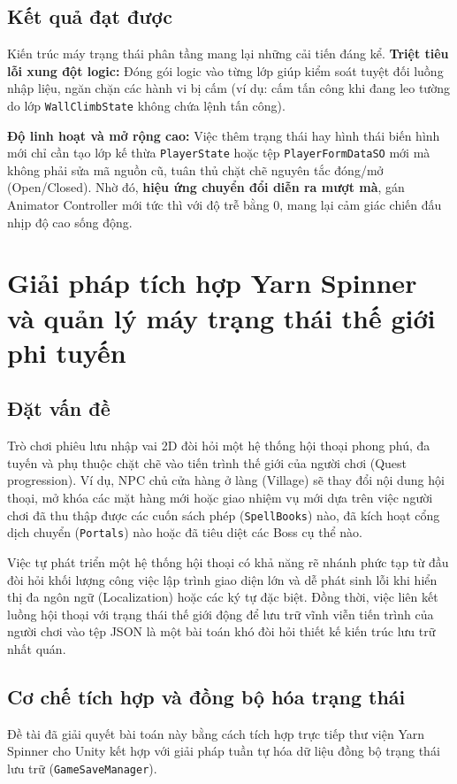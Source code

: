 \subsection{Kết quả đạt được}
Kiến trúc máy trạng thái phân tầng mang lại những cải tiến đáng kể. \textbf{Triệt tiêu lỗi xung đột logic:} Đóng gói logic vào từng lớp giúp kiểm soát tuyệt đối luồng nhập liệu, ngăn chặn các hành vi bị cấm (ví dụ: cấm tấn công khi đang leo tường do lớp \texttt{WallClimbState} không chứa lệnh tấn công).

\textbf{Độ linh hoạt và mở rộng cao:} Việc thêm trạng thái hay hình thái biến hình mới chỉ cần tạo lớp kế thừa \texttt{PlayerState} hoặc tệp \texttt{PlayerFormDataSO} mới mà không phải sửa mã nguồn cũ, tuân thủ chặt chẽ nguyên tắc đóng/mở (Open/Closed). Nhờ đó, \textbf{hiệu ứng chuyển đổi diễn ra mượt mà}, gán Animator Controller mới tức thì với độ trễ bằng 0, mang lại cảm giác chiến đấu nhịp độ cao sống động.

\section{Giải pháp tích hợp Yarn Spinner và quản lý máy trạng thái thế giới phi tuyến}

\subsection{Đặt vấn đề}
Trò chơi phiêu lưu nhập vai 2D đòi hỏi một hệ thống hội thoại phong phú, đa tuyến và phụ thuộc chặt chẽ vào tiến trình thế giới của người chơi (Quest progression). Ví dụ, NPC chủ cửa hàng ở làng (Village) sẽ thay đổi nội dung hội thoại, mở khóa các mặt hàng mới hoặc giao nhiệm vụ mới dựa trên việc người chơi đã thu thập được các cuốn sách phép (\texttt{SpellBooks}) nào, đã kích hoạt cổng dịch chuyển (\texttt{Portals}) nào hoặc đã tiêu diệt các Boss cụ thể nào.

Việc tự phát triển một hệ thống hội thoại có khả năng rẽ nhánh phức tạp từ đầu đòi hỏi khối lượng công việc lập trình giao diện lớn và dễ phát sinh lỗi khi hiển thị đa ngôn ngữ (Localization) hoặc các ký tự đặc biệt. Đồng thời, việc liên kết luồng hội thoại với trạng thái thế giới động để lưu trữ vĩnh viễn tiến trình của người chơi vào tệp JSON là một bài toán khó đòi hỏi thiết kế kiến trúc lưu trữ nhất quán.

\subsection{Cơ chế tích hợp và đồng bộ hóa trạng thái}
Đề tài đã giải quyết bài toán này bằng cách tích hợp trực tiếp thư viện Yarn Spinner cho Unity kết hợp với giải pháp tuần tự hóa dữ liệu đồng bộ trạng thái lưu trữ (\texttt{GameSaveManager}).

